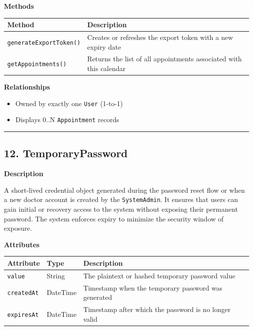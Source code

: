 \documentclass[12pt, a4paper]{article}
\begin{document}
\textbf{Methods}

\begin{center}
\small
\renewcommand{\arraystretch}{1.35}
\begin{tabularx}{\textwidth}{|M|Y|}
\hline
{}
\textbf{Method} & \textbf{Description} \\ \hline
\texttt{generateExportToken()} & Creates or refreshes the export token with a new expiry date \\ \hline
\texttt{getAppointments()} & Returns the list of all appointments associated with this calendar \\ \hline
\end{tabularx}
\end{center}

\textbf{Relationships}

\begin{itemize}
    \item Owned by exactly one \texttt{User} (1-to-1)
    \item Displays 0..N \texttt{Appointment} records
\end{itemize}

\par\medskip\hrule\medskip

\subsection{12. TemporaryPassword}\label{sec:12-temporarypassword}

\textbf{Description}

A short-lived credential object generated during the password reset flow or when a new doctor account is created by the \texttt{SystemAdmin}. It ensures that users can gain initial or recovery access to the system without exposing their permanent password. The system enforces expiry to minimize the security window of exposure.

\textbf{Attributes}

\begin{center}
\small
\renewcommand{\arraystretch}{1.35}
\begin{tabularx}{\textwidth}{|>{\raggedright\arraybackslash}p{3.4cm}|>{\raggedright\arraybackslash}p{3.3cm}|Y|}
\hline
{}
\textbf{Attribute} & \textbf{Type} & \textbf{Description} \\ \hline
\texttt{value} & String & The plaintext or hashed temporary password value \\ \hline
\texttt{createdAt} & DateTime & Timestamp when the temporary password was generated \\ \hline
\texttt{expiresAt} & DateTime & Timestamp after which the password is no longer valid \\ \hline
\end{tabularx}
\end{center}
\end{document}

